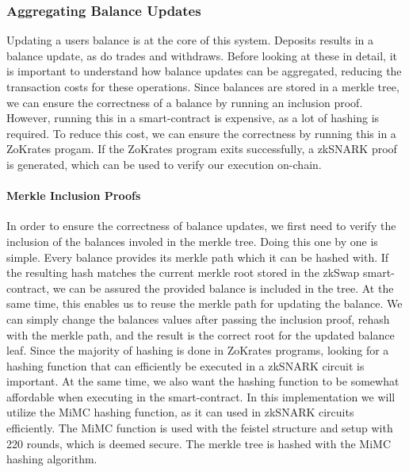 \documentclass[../../thesis.tex]{subfiles}
\begin{document}
\subsubsection{Aggregating Balance Updates} \label{aggr_balance}
Updating a users balance is at the core of this system. Deposits results in a balance update, as do trades and withdraws. Before looking at these in detail, it is important to understand how balance updates can be aggregated, reducing the transaction costs for these operations. Since balances are stored in a merkle tree, we can ensure the correctness of a balance by running an inclusion proof. However, running this in a smart-contract is expensive, as a lot of hashing is required. To reduce this cost, we can ensure the correctness by running this in a ZoKrates progam. If the ZoKrates program exits successfully, a zkSNARK proof is generated, which can be used to verify our execution on-chain.

\paragraph{Merkle Inclusion Proofs}
In order to ensure the correctness of balance updates, we first need to verify the inclusion of the balances involed in the merkle tree. Doing this one by one is simple. Every balance provides its merkle path which it can be hashed with. If the resulting hash matches the current merkle root stored in the zkSwap smart-contract, we can be assured the provided balance is included in the tree. At the same time, this enables us to reuse the merkle path for updating the balance. We can simply change the balances values after passing the inclusion proof, rehash with the merkle path, and the result is the correct root for the updated balance leaf. Since the majority of hashing is done in ZoKrates programs, looking for a hashing function that can efficiently be executed in a zkSNARK circuit is important. At the same time, we also want the hashing function to be somewhat affordable when executing in the smart-contract. In this implementation we will utilize the MiMC \cite{albrecht2016mimc} hashing function, as it can used in zkSNARK circuits efficiently. The MiMC function is used with the feistel structure and setup with 220 rounds, which is deemed secure. The merkle tree is hashed with the MiMC hashing algorithm. 
\end{document}
